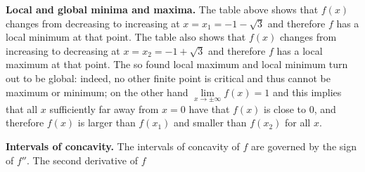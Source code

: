 {\textbf{Local and global minima and maxima. } The table above shows that $f(x)$ changes from decreasing to increasing at $x=x_1=-1-\sqrt{3}$ and therefore $f$ has a local minimum at that point. The table also shows that $f(x)$ changes from increasing to decreasing at $ x=x_2=-1+\sqrt{3}$ and therefore $f$ has a local maximum at that point. The so found local maximum and local minimum turn out to be global: indeed, no other finite point is critical and thus cannot be maximum or minimum; on the other hand $\lim\limits_{x\to\pm \infty}f(x)=1$ and this implies that all $x$ sufficiently far away from $x=0$ have that $f(x)$ is close to $0$, and therefore $f(x)$ is larger than $f(x_1)$ and smaller than $f(x_2)$ for all $x$.

\textbf{Intervals of concavity. } 
The intervals of concavity of $f$ are governed by the sign of $f''$. The second derivative of $f$

}